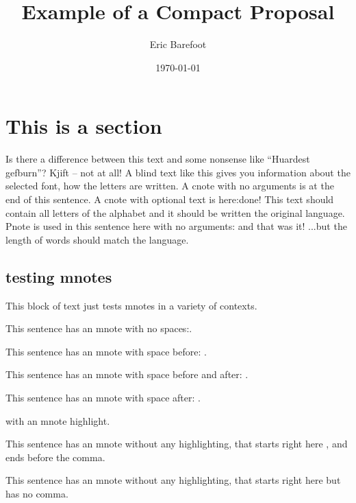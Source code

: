 \documentclass[draft]{compact_proposal}
\title{Example of a Compact Proposal}
\author{Eric Barefoot}
\date{\today}
\begin{document}
\maketitle

\section{This is a section}
Is there a difference between this text and some nonsense like ``Huardest gefburn''? Kjift – not at all!
A blind text like this gives you information about the  selected font, how the letters are written. A cnote with no arguments is at the end of this sentence\cnote.
A cnote with optional text is here: done!
This text should contain all letters of the alphabet and it should be written  the original language.
Pnote is used in this sentence here with no arguments: \pnote and that was it! ...but the length of words  should match the language.



\subsection{testing mnotes}

This block of text just tests mnotes in a variety of contexts.

This sentence has an mnote with no spaces:.

This sentence has an mnote with space before: .

This sentence has an mnote with space before and after:  .

This sentence has an mnote with space after: .

 with an mnote highlight.

This sentence has an mnote without any highlighting, that starts right here , and ends before the comma. 

This sentence has an mnote without any highlighting, that starts right here  but has no comma. 
\end{document}
